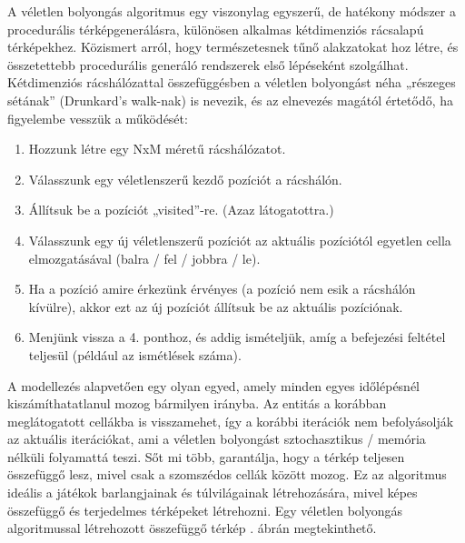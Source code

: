 A véletlen bolyongás algoritmus egy viszonylag egyszerű, de hatékony módszer a procedurális térképgenerálásra, különösen alkalmas kétdimenziós rácsalapú térképekhez. Közismert arról, hogy természetesnek tűnő alakzatokat hoz létre, és összetettebb procedurális generáló rendszerek első lépéseként szolgálhat. Kétdimenziós rácshálózattal összefüggésben a véletlen bolyongást néha „részeges sétának” (Drunkard’s walk-nak) is nevezik, és az elnevezés magától értetődő, ha figyelembe vesszük a működését:\cite{randomwalk}
\begin{enumerate}
\item Hozzunk létre egy NxM méretű rácshálózatot.\cite{randomwalk}
\item Válasszunk egy véletlenszerű kezdő pozíciót a rácshálón.\cite{randomwalk}
\item Állítsuk be a pozíciót „visited”-re. (Azaz látogatottra.)\cite{randomwalk}
\item Válasszunk egy új véletlenszerű pozíciót az aktuális pozíciótól egyetlen cella elmozgatásával (balra / fel / jobbra / le).\cite{randomwalk}
\item Ha a pozíció amire érkezünk érvényes (a pozíció nem esik a rácshálón kívülre), akkor ezt az új pozíciót állítsuk be az aktuális pozíciónak.\cite{randomwalk}
\item Menjünk vissza a 4. ponthoz, és addig ismételjük, amíg a befejezési feltétel teljesül (például az ismétlések száma).\cite{randomwalk}
\end{enumerate}

A modellezés alapvetően egy olyan egyed, amely minden egyes időlépésnél kiszámíthatatlanul mozog bármilyen irányba. Az entitás a korábban meglátogatott cellákba is visszamehet, így a korábbi iterációk nem befolyásolják az aktuális iterációkat, ami a véletlen bolyongást sztochasztikus / memória nélküli folyamattá teszi. Sőt mi több, garantálja, hogy a térkép teljesen összefüggő lesz, mivel csak a szomszédos cellák között mozog. Ez az algoritmus ideális a játékok barlangjainak és túlvilágainak létrehozására, mivel képes összefüggő és terjedelmes térképeket létrehozni.\cite{randomwalk} Egy véletlen bolyongás algoritmussal létrehozott összefüggő térkép . ábrán megtekinthető.

